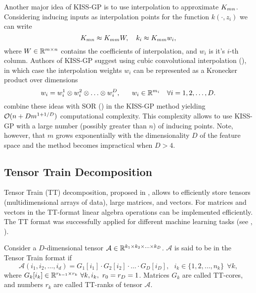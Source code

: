   Another major idea of KISS-GP is to use interpolation to approximate $K_{mn}$.
  Considering inducing inputs as interpolation points for the function
  $k(\cdot, z_i)$ we can write
  \begin{equation}
  \label{kernel_interpolation}
    K_{mn} \approx K_{mm} W,~~~k_{i} \approx K_{mm} w_i,
  \end{equation}
  where $W \in \mathbb{R}^{m \times n}$ contains the coefficients of interpolation, and
  $w_i$ is it's $i$-th column. Authors of KISS-GP suggest using cubic
  convolutional interpolation (\citet{keys1981}), in which case the interpolation
  weights $w_i$ can be represented as a Kronecker product over dimensions
  \[
    w_i = w_i^1 \otimes w_i^2 \otimes \ldots \otimes w_i^D,~~~~~w_i \in \mathbb{R}^{m_i}~~~\forall i = 1, 2, \ldots, D.
  \]
  \citet{wilson2015} combine these ideas with SOR (\citet{silverman1985})
  in the KISS-GP method yielding $\mathcal{O}(n + D m^{1 + 1/D})$ computational
  complexity. This complexity allows to use KISS-GP with a large number (possibly
  greater than $n$) of inducing points. Note, however, that $m$ grows
  exponentially with the dimensionality $D$ of the feature space and the
  method becomes impractical when $D > 4$.

\subsection{Tensor Train Decomposition}
\label{tensor_train}

  Tensor Train (TT) decomposition, proposed in \citet{oseledets2011}, allows to
  efficiently store tensors (multidimensional arrays of data), large matrices, and
  vectors. For matrices and vectors in the TT-format linear algebra operations
  can be implemented efficiently. The TT format was successfully applied for
  different machine learning tasks (see \citet{novikov2014}, \citet{novikov2015}).

  Consider a $D$-dimensional tensor $\mathcal A \in \mathbb{R}^{k_1 \times k_2 \times \ldots \times k_D}$.
  $\mathcal{A}$ is said to be in the Tensor Train format if
  \begin{equation}
  \label{tt}
    \mathcal{A}(i_1, i_2, \ldots, i_d) = G_1[i_1] \cdot G_2[i_2] \cdot \ldots \cdot G_D[i_D],~~~
    i_k \in \{1, 2, \ldots, n_k\}~~\forall k,
  \end{equation}
  where $G_k[i_k] \in \R^{r_{k-1}\times r_{k}}\ \forall k, i_k,\ r_0 = r_{D} = 1$. Matrices $G_k$ are called TT-cores, and numbers $r_k$ are called TT-ranks of
  tensor $\mathcal{A}$.

